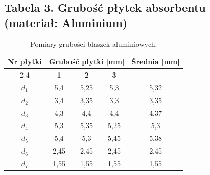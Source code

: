 \documentclass{article}
\begin{document}
\clearpage


\subsection*{Tabela 3. Grubość płytek absorbentu (materiał: Aluminium)}
\begin{table}[H]
\centering
\renewcommand{\arraystretch}{1.3}
\begin{tabular}{|c|c|c|c|c|}
\hline
\multirow{2}{*}{\textbf{Nr płytki}} & \multicolumn{3}{c|}{\textbf{Grubość płytki [mm]}} & \multirow{2}{*}{\textbf{Średnia [mm]}} \\ \cline{2-4}
 & \textbf{1} & \textbf{2} & \textbf{3} &  \\ \hline
$d_1$ &5,4 &5,25 &5,3 &5,32 \\ \hline
$d_2$ &3,4 &3,35 &3,3 &3,35 \\ \hline
$d_3$ &4,3 &4,4 &4,4 &4,37 \\ \hline
$d_4$ &5,3 & 5,35& 5,25&5,3 \\ \hline
$d_5$ &5,4 &5,3 &5,45 &5,38 \\ \hline
$d_6$ &2,45 &2,45 &2,45 &2,45 \\ \hline
$d_7$ &1,55 &1,55 &1,55 &1,55 \\ \hline
\end{tabular}
\caption{Pomiary grubości blaszek aluminiowych.}
\end{table}
\end{document}
